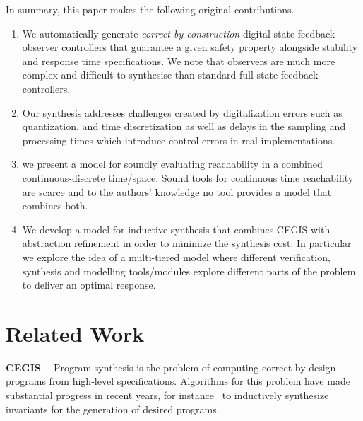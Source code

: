\documentclass[sigconf]{llncs}
\begin{document}
In summary, this paper makes the following original contributions.
%
\begin{enumerate}

\item We automatically generate \emph{correct-by-construction} digital
  state-feedback observer controllers that guarantee a given safety property
  alongside stability and response time specifications.  We note that
  observers are much more complex and difficult to synthesise than standard
  full-state feedback controllers.
%
\item  Our synthesis addresses challenges created by digitalization errors
 such as quantization, and time discretization as well as delays in the
 sampling and processing times which introduce control errors in real
 implementations.
 \item we present a model for soundly evaluating reachability in a combined 
 continuous-discrete time/space. Sound tools for continuous time reachability 
 are scarce and to the authors' knowledge no tool provides a model that 
 combines both. 
%
\item We develop a model for inductive synthesis that combines CEGIS with
abstraction refinement in order to minimize the synthesis cost. In particular
we explore the idea of a multi-tiered model where different verification, 
synthesis and modelling tools/modules explore different parts of the problem
to deliver an optimal response.
%
\end{enumerate}

\section{Related Work}
\label{sec:relw}

\textbf{CEGIS --}
Program synthesis is the problem of computing correct-by-design programs
from high-level specifications.  Algorithms for this problem have made
substantial progress in recent years, for instance~\cite{itzhaky2010simple}
to inductively synthesize invariants for the generation of desired programs.
\end{document}
